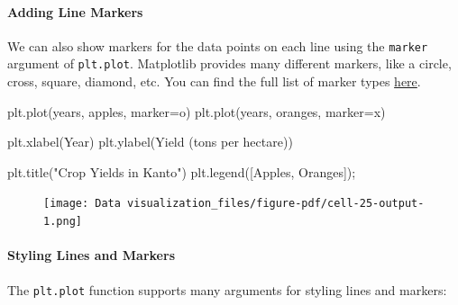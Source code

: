 \documentclass[
  letterpaper,
  DIV=11,
  numbers=noendperiod]{scrreprt}
\let\oldparagraph\paragraph
\renewcommand{\paragraph}[1]{\oldparagraph{#1}\mbox{}}
\newenvironment{Shaded}{\begin{snugshade}}{\end{snugshade}}
\newcommand{\NormalTok}[1]{\textcolor[rgb]{0.00,0.23,0.31}{#1}}
\newcommand{\OperatorTok}[1]{\textcolor[rgb]{0.37,0.37,0.37}{#1}}
\newcommand{\StringTok}[1]{\textcolor[rgb]{0.13,0.47,0.30}{#1}}
\begin{document}
\hypertarget{adding-line-markers}{%
\paragraph{Adding Line Markers}\label{adding-line-markers}}

We can also show markers for the data points on each line using the
\texttt{marker} argument of \texttt{plt.plot}. Matplotlib provides many
different markers, like a circle, cross, square, diamond, etc. You can
find the full list of marker types
\href{https://matplotlib.org/3.1.1/api/markers_api.html}{here}.

\begin{Shaded}
\begin{Highlighting}[]
\NormalTok{plt.plot(years, apples, marker}\OperatorTok{=}\StringTok{\textquotesingle{}o\textquotesingle{}}\NormalTok{)}
\NormalTok{plt.plot(years, oranges, marker}\OperatorTok{=}\StringTok{\textquotesingle{}x\textquotesingle{}}\NormalTok{)}

\NormalTok{plt.xlabel(}\StringTok{\textquotesingle{}Year\textquotesingle{}}\NormalTok{)}
\NormalTok{plt.ylabel(}\StringTok{\textquotesingle{}Yield (tons per hectare)\textquotesingle{}}\NormalTok{)}

\NormalTok{plt.title(}\StringTok{"Crop Yields in Kanto"}\NormalTok{)}
\NormalTok{plt.legend([}\StringTok{\textquotesingle{}Apples\textquotesingle{}}\NormalTok{, }\StringTok{\textquotesingle{}Oranges\textquotesingle{}}\NormalTok{])}\OperatorTok{;}
\end{Highlighting}
\end{Shaded}

\begin{figure}[H]

{\centering \texttt{[image: Data visualization\_files/figure-pdf/cell-25-output-1.png]}

}

\end{figure}

\hypertarget{styling-lines-and-markers}{%
\paragraph{Styling Lines and Markers}\label{styling-lines-and-markers}}

The \texttt{plt.plot} function supports many arguments for styling lines
and markers:
\end{document}
